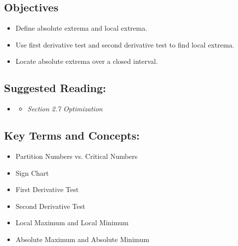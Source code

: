 \vspace{-0.25 in}
\begin{framed}
\subsection*{Objectives}
\begin{itemize}
    \item Define absolute extrema and local extrema.
    \item Use first derivative test and second derivative test to find local extrema.
    \item Locate absolute extrema over a closed interval.
\end{itemize}

\subsection*{Suggested Reading:}
\begin{itemize}
\item \cite{Calaway}\footnotemark[1]
   \begin{itemize}
        \item \emph{Section 2.7 Optimization}
    \end{itemize}
\end{itemize}
\subsection*{Key Terms and Concepts:} 

\begin{multicols}{2}
\begin{itemize}
    \item Partition Numbers vs. Critical Numbers
    \item Sign Chart
    \item First Derivative Test
    \item Second Derivative Test
    \item Local Maximum and Local Minimum
    \item Absolute Maximum and Absolute Minimum
\end{itemize}
\end{multicols}
\end{framed}

